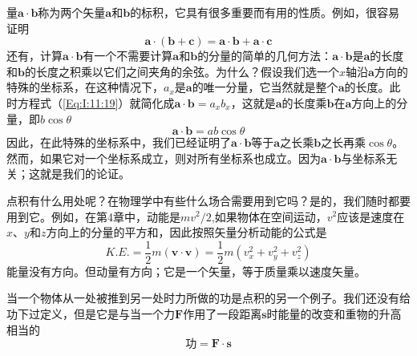 量$\boldsymbol{a} \cdot \boldsymbol{b}$称为两个矢量$\boldsymbol{a}$和$\boldsymbol{b}$的标积，它具有很多重要而有用的性质。例如，很容易证明
\begin{equation}
    \label{Eq:I:11:21}
    \boldsymbol{a} \cdot (\boldsymbol{b}+\boldsymbol{c})=\boldsymbol{a} \cdot \boldsymbol{b}+\boldsymbol{a} \cdot \boldsymbol{c}
\end{equation}
还有，计算$\boldsymbol{a} \cdot \boldsymbol{b}$有一个不需要计算$\boldsymbol{a}$和$\boldsymbol{b}$的分量的简单的几何方法：$\boldsymbol{a} \cdot \boldsymbol{b}$是$\boldsymbol{a}$的长度和$\boldsymbol{b}$的长度之积乘以它们之间夹角的余弦。为什么？假设我们选一个$x$轴沿$\boldsymbol{a}$方向的特殊的坐标系，在这种情况下，$a_x$是$\boldsymbol{a}$的唯一分量，它当然就是整个$\boldsymbol{a}$的长度。此时方程式（\ref{Eq:I:11:19}）就简化成$\boldsymbol{a} \cdot \boldsymbol{b}=a_xb_x$，这就是$\boldsymbol{a}$的长度乘$\boldsymbol{b}$在$\boldsymbol{a}$方向上的分量，即$b\cos\theta$
\begin{equation*}
    \boldsymbol{a} \cdot \boldsymbol{b}=ab\cos\theta
\end{equation*}
因此，在此特殊的坐标系中，我们已经证明了$\boldsymbol{a} \cdot \boldsymbol{b}$等于$\boldsymbol{a}$之长乘$\boldsymbol{b}$之长再乘$\cos\theta$。然而，如果它对一个坐标系成立，则对所有坐标系也成立。因为$\boldsymbol{a} \cdot \boldsymbol{b}$与坐标系无关；这就是我们的论证。

点积有什么用处呢？在物理学中有些什么场合需要用到它吗？是的，我们随时都要用到它。例如，在第4章中，动能是$mv^2/2$,如果物体在空间运动，$v^2$应该是速度在$x$、$y$和$z$方向上的分量的平方和，因此按照矢量分析动能的公式是
\begin{equation}
    \label{Eq:I:11:22}
    K.E.=\frac{1}{2}m(\boldsymbol{v} \cdot \boldsymbol{v})=\frac{1}{2}m(v_x^2+v_y^2+v_z^2)
\end{equation}
能量没有方向。但动量有方向；它是一个矢量，等于质量乘以速度矢量。

当一个物体从一处被推到另一处时力所做的功是点积的另一个例子。我们还没有给功下过定义，但是它是与当一个力$\boldsymbol{F}$作用了一段距离$\boldsymbol{s}$时能量的改变和重物的升高相当的
\begin{equation}
    \label{Eq:I:11:23}
    \text{功}=\boldsymbol{F} \cdot \boldsymbol{s}
\end{equation}

